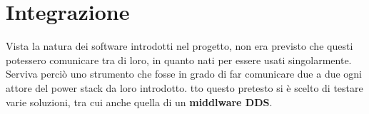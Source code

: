 \section{Integrazione}
Vista la natura dei software introdotti nel progetto, non era previsto che questi potessero comunicare tra di loro, in quanto nati per essere usati singolarmente. Serviva perciò uno strumento che fosse in grado di far comunicare due a due ogni attore del power stack da loro introdotto. 
tto questo pretesto si è scelto di testare varie soluzioni, tra cui anche quella di un \textbf{middlware DDS}. %